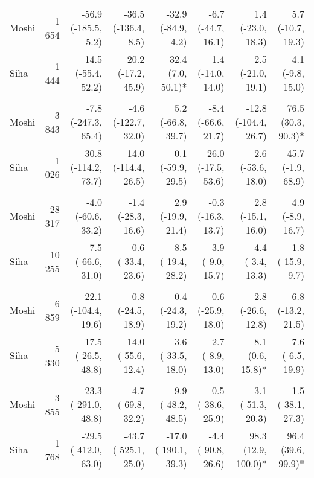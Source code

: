 \begin{table}[t]
\begin{tabular*}{\linewidth}{@{\extracolsep{\fill}}l|rrrrrrr}
\midrule\addlinespace[2.5pt]
\multicolumn{8}{l}{Snake and Insect Bites} \\[2.5pt] 
\midrule\addlinespace[2.5pt]
Moshi & 1 654 & -56.9 (-185.5, 5.2)  & -36.5 (-136.4, 8.5)  & -32.9 (-84.9, 4.2)  & -6.7 (-44.7, 16.1)  & 1.4 (-23.0, 18.3)  & 5.7 (-10.7, 19.3)  \\ 
Siha & 1 444 & 14.5 (-55.4, 52.2)  & 20.2 (-17.2, 45.9)  & 32.4 (7.0, 50.1)* & 1.4 (-14.0, 14.0)  & 2.5 (-21.0, 19.1)  & 4.1 (-9.8, 15.0)  \\ 
\midrule\addlinespace[2.5pt]
\multicolumn{8}{l}{Substance Abuse} \\[2.5pt] 
\midrule\addlinespace[2.5pt]
Moshi & 3 843 & -7.8 (-247.3, 65.4)  & -4.6 (-122.7, 32.0)  & 5.2 (-66.8, 39.7)  & -8.4 (-66.6, 21.7)  & -12.8 (-104.4, 26.7)  & 76.5 (30.3, 90.3)* \\ 
Siha & 1 026 & 30.8 (-114.2, 73.7)  & -14.0 (-114.4, 26.5)  & -0.1 (-59.9, 29.5)  & 26.0 (-17.5, 53.6)  & -2.6 (-53.6, 18.0)  & 45.7 (-1.9, 68.9)  \\ 
\midrule\addlinespace[2.5pt]
\multicolumn{8}{l}{Fractures} \\[2.5pt] 
\midrule\addlinespace[2.5pt]
Moshi & 28 317 & -4.0 (-60.6, 33.2)  & -1.4 (-28.3, 16.6)  & 2.9 (-19.9, 21.4)  & -0.3 (-16.3, 13.7)  & 2.8 (-15.1, 16.0)  & 4.9 (-8.9, 16.7)  \\ 
Siha & 10 255 & -7.5 (-66.6, 31.0)  & 0.6 (-33.4, 23.6)  & 8.5 (-19.4, 28.2)  & 3.9 (-9.0, 15.7)  & 4.4 (-3.4, 13.3)  & -1.8 (-15.9, 9.7)  \\ 
\midrule\addlinespace[2.5pt]
\multicolumn{8}{l}{Road Traffic Accidents} \\[2.5pt] 
\midrule\addlinespace[2.5pt]
Moshi & 6 859 & -22.1 (-104.4, 19.6)  & 0.8 (-24.5, 18.9)  & -0.4 (-24.3, 19.2)  & -0.6 (-25.9, 18.0)  & -2.8 (-26.6, 12.8)  & 6.8 (-13.2, 21.5)  \\ 
Siha & 5 330 & 17.5 (-26.5, 48.8)  & -14.0 (-55.6, 12.4)  & -3.6 (-33.5, 18.0)  & 2.7 (-8.9, 13.0)  & 8.1 (0.6, 15.8)* & 7.6 (-6.5, 19.9)  \\ 
\midrule\addlinespace[2.5pt]
\multicolumn{8}{l}{Typhoid} \\[2.5pt] 
\midrule\addlinespace[2.5pt]
Moshi & 3 855 & -23.3 (-291.0, 48.8)  & -4.7 (-69.8, 32.2)  & 9.9 (-48.2, 48.5)  & 0.5 (-38.6, 25.9)  & -3.1 (-51.3, 20.3)  & 1.5 (-38.1, 27.3)  \\ 
Siha & 1 768 & -29.5 (-412.0, 63.0)  & -43.7 (-525.1, 25.0)  & -17.0 (-190.1, 39.3)  & -4.4 (-90.8, 26.6)  & 98.3 (12.9, 100.0)* & 96.4 (39.6, 99.9)* \\ 

\end{tabular*}
\end{table}
